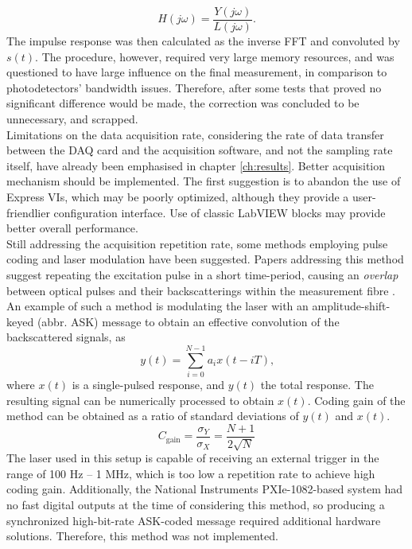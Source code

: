\documentclass{standalone}
\begin{document}
\begin{equation}
H(j\omega) = \frac{Y(j\omega)}{L(j\omega)} \textrm{.}
\end{equation}
The impulse response was then calculated as the inverse FFT and convoluted by $s(t)$. The procedure, however, required very large memory resources, and was questioned to have large influence on the final measurement, in comparison to photodetectors' bandwidth issues. Therefore, after some tests that proved no significant difference would be made, the correction was concluded to be unnecessary, and scrapped. \\

Limitations on the data acquisition rate, considering the rate of data transfer between the DAQ card and the acquisition software, and not the sampling rate itself, have already been emphasised in chapter \ref{ch:results}. Better acquisition mechanism should be implemented. The first suggestion is to abandon the use of Express VIs, which may be poorly optimized, although they provide a user-friendlier configuration interface. Use of classic LabVIEW blocks may provide better overall performance. \\

Still addressing the acquisition repetition rate, some methods employing pulse coding and laser modulation have been suggested. Papers addressing this method suggest repeating the excitation pulse in a short time-period, causing an \textit{overlap} between optical pulses and their backscatterings within the measurement fibre \cite{coding1}\cite{coding2}\cite{coding3}\cite{coding4}. An example of such a method is modulating the laser with an amplitude-shift-keyed (abbr. ASK) message to obtain an effective convolution of the backscattered signals, as
\begin{equation}
y(t) = \sum_{i = 0}^{N-1} a_i x(t - iT) \textrm{,}
\end{equation}
where $x(t)$ is a single-pulsed response, and $y(t)$ the total response. The resulting signal can be numerically processed to obtain $x(t)$. Coding gain of the method can be obtained as a ratio of standard deviations of $y(t)$ and $x(t)$.
\begin{equation}
C_\textrm{gain} = \frac{\sigma_Y}{\sigma_X} = \frac{N+1}{2 \sqrt{N}}
\end{equation}
The laser used in this setup is capable of receiving an external trigger in the range of 100 Hz -- 1 MHz, which is too low a repetition rate to achieve high coding gain. Additionally, the National Instruments PXIe-1082-based system had no fast digital outputs at the time of considering this method, so producing a synchronized high-bit-rate ASK-coded message required additional hardware solutions. Therefore, this method was not implemented. \\
\end{document}
